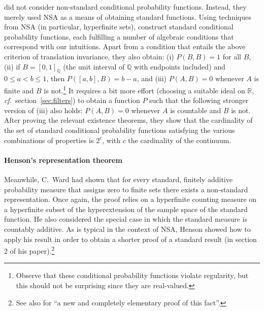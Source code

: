 \citet{ParikhParnes:1974} did not consider non-standard conditional probability functions. Instead, they merely used NSA as a means of obtaining standard functions.
Using techniques from NSA (in particular, hyperfinite sets), \citet{ParikhParnes:1974} construct standard conditional probability functions, each fulfilling a number of algebraic conditions that correspond with our intuitions. Apart from a condition that entails the above criterion of translation invariance, they also obtain: (i) $P(B,B)=1$ for all $B$, (ii) if $B=[0,1]_\mathbb{Q}$ (the unit interval of $\mathbb{Q}$ with endpoints included) and $0 \leq a < b \leq 1$, then $P([a,b],B)=b-a$, and (iii) $P(A,B)=0$ whenever $A$ is finite and $B$ is not.\footnote{Observe that these conditional probability functions violate regularity, but this should not be surprising since they are real-valued.} It requires a bit more effort (choosing a suitable ideal on $\mathbb{R}$, \textit{cf.}\ section~\ref{sec:filters}) to obtain a function $P$ such that the following stronger version of (iii) also holds: $P(A,B)=0$ whenever $A$ is countable and $B$ is not.
After proving the relevant existence theorems, they show that the cardinality of the set of standard conditional probability functions satisfying the various combinations of properties is $2^c$, with $c$ the cardinality of the continuum.

\paragraph{Henson's representation theorem}
Meanwhile, C.~Ward \citet{Henson:1972} had shown that for every standard, finitely additive probability measure that assigns zero to finite sets there exists a non-standard representation. Once again, the proof relies on a hyperfinite counting measure on a hyperfinite subset of the hyperextension of the sample space of the standard function. He also considered the special case in which the standard measure is countably additive. As is typical in the context of NSA, Henson showed how to apply his result in order to obtain a shorter proof of a standard result (in section 2 of his paper).\footnote{See also \citet{HofweberSchindler:2016} for ``a new and completely elementary proof of this fact''.}

